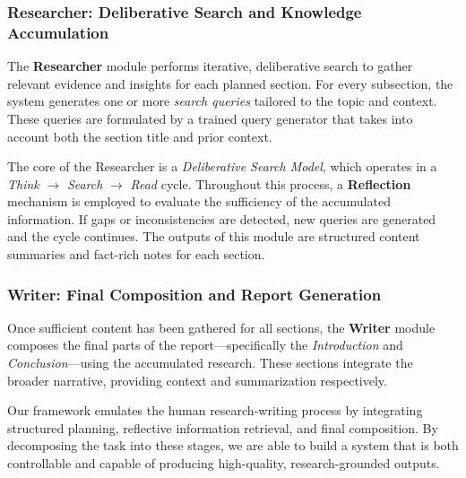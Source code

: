 \documentclass[11pt]{article}
\begin{document}
\subsubsection{Researcher: Deliberative Search and Knowledge Accumulation}

The \textbf{Researcher} module performs iterative, deliberative search to gather relevant evidence and insights for each planned section. For every subsection, the system generates one or more \textit{search queries} tailored to the topic and context. These queries are formulated by a trained query generator that takes into account both the section title and prior context.

The core of the Researcher is a \textit{Deliberative Search Model}, which operates in a \textit{Think} $\rightarrow$ \textit{Search} $\rightarrow$ \textit{Read} cycle. Throughout this process, a \textbf{Reflection} mechanism is employed to evaluate the sufficiency of the accumulated information. If gaps or inconsistencies are detected, new queries are generated and the cycle continues. The outputs of this module are structured content summaries and fact-rich notes for each section.

\subsubsection{Writer: Final Composition and Report Generation}

Once sufficient content has been gathered for all sections, the \textbf{Writer} module composes the final parts of the report---specifically the \textit{Introduction} and \textit{Conclusion}---using the accumulated research. These sections integrate the broader narrative, providing context and summarization respectively.

Our framework emulates the human research-writing process by integrating structured planning, reflective information retrieval, and final composition. By decomposing the task into these stages, we are able to build a system that is both controllable and capable of producing high-quality, research-grounded outputs.
\end{document}
